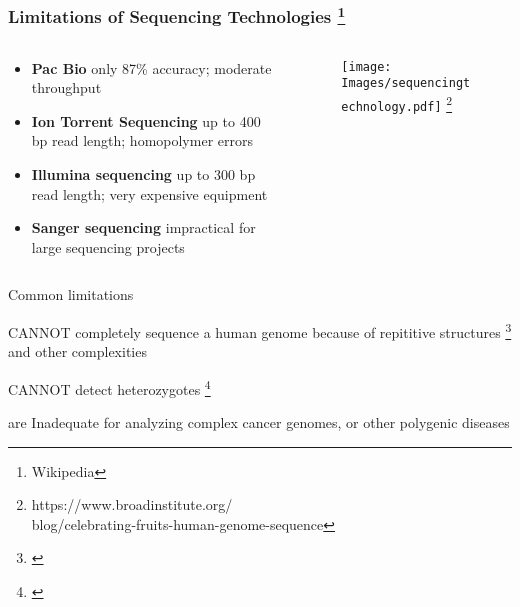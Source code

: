 \documentclass[10pt,dvipsnames,table]{beamer}
\begin{document}
\begin{frame}
\frametitle{Limitations of Sequencing Technologies \footnote{\tiny{Wikipedia}} }
\vspace{-0.8cm}
\begin{columns}[t]
\begin{column}{0.6\textwidth}
\begin{itemize} 

\item {\bf{\small{Pac Bio}}}
{\footnotesize{only 87\% accuracy; moderate throughput }}

\item {\bf{\small{Ion Torrent Sequencing}}}
{\footnotesize{up to 400 bp read length; homopolymer errors }}

\item {\bf{\small{Illumina sequencing}}}
{\footnotesize{up to 300 bp read length; very expensive equipment}}

\item {\bf{\small{Sanger sequencing}}}
{\footnotesize{impractical for large sequencing projects}}

\end{itemize}
\end{column}

\begin{column}{0.4\textwidth}
\begin{center}
\begin{figure}[t]
\texttt{[image: Images/sequencingtechnology.pdf]} \footnote{\tiny{https://www.broadinstitute.org/ \\blog/celebrating-fruits-human-genome-sequence}}
\end{figure}
\end{center}
\end{column}

\end{columns}

\begin{block}{Common limitations}
\begin{itemize}
{\small{
\item CANNOT completely sequence a human genome because of repititive structures \footnote{\cite{Lander_etal_2001_Nature}} and other complexities
\item CANNOT detect heterozygotes \footnote{\cite{Wheeler_etal_2008_Nature}}
\item are Inadequate for analyzing complex cancer genomes, or other polygenic diseases
}}
\end{itemize}
\end{block}
\note{}
\end{frame}
\end{document}
